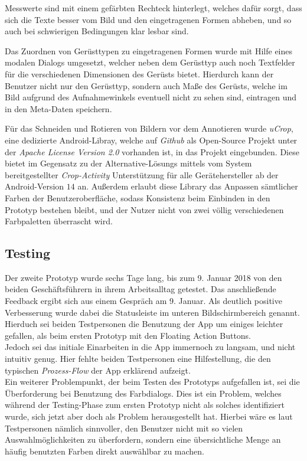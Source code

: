 Messwerte sind mit einem gefärbten Rechteck hinterlegt, welches dafür sorgt, dass sich die Texte besser vom Bild und den eingetragenen Formen abheben, und so auch bei schwierigen Bedingungen klar lesbar sind. 

Das Zuordnen von Gerüsttypen zu eingetragenen Formen wurde mit Hilfe eines modalen Dialogs umgesetzt, welcher neben dem Gerüsttyp auch noch Textfelder für die verschiedenen Dimensionen des Gerüsts bietet.
Hierdurch kann der Benutzer nicht nur den Gerüsttyp, sondern auch Maße des Gerüsts, welche im Bild aufgrund des Aufnahmewinkels eventuell nicht zu sehen sind, eintragen und in den Meta-Daten speichern.

Für das Schneiden und Rotieren von Bildern vor dem Annotieren wurde \emph{uCrop}, eine dedizierte Android-Libray, welche auf \emph{Github} als Open-Source Projekt unter der \emph{Apache License Version 2.0} vorhanden ist, in das Projekt eingebunden.  
Diese bietet im Gegensatz zu der Alternative-Lösungs mittels vom System bereitgestellter \emph{Crop-Activity} Unterstützung für alle Gerätehersteller ab der Android-Version $14$ an.
Außerdem erlaubt diese Library das Anpassen sämtlicher Farben der Benutzeroberfläche, sodass Konsistenz beim Einbinden in den Prototyp bestehen bleibt, und der Nutzer nicht von zwei völlig verschiedenen Farbpaletten überrascht wird. 

\subsection{Testing}
Der zweite Prototyp wurde sechs Tage lang, bis zum 9. Januar 2018 von den beiden Geschäftsführern in ihrem Arbeitsalltag getestet.
Das anschließende Feedback ergibt sich aus einem Gespräch am 9. Januar.
Als deutlich positive Verbesserung wurde dabei die Statusleiste im unteren Bildschirmbereich genannt.
Hierduch sei beiden Testpersonen die Benutzung der App um einiges leichter gefallen, als beim ersten Prototyp mit den Floating Action Buttons. \\

Jedoch sei das initiale Einarbeiten in die App immernoch zu langsam, und nicht intuitiv genug.
Hier fehlte beiden Testpersonen eine Hilfestellung, die den typischen \emph{Prozess-Flow} der App erklärend aufzeigt. \\

Ein weiterer Problempunkt, der beim Testen des Prototyps aufgefallen ist, sei die Überforderung bei Benutzung des Farbdialogs.
Dies ist ein Problem, welches während der Testing-Phase zum ersten Prototyp nicht als solches identifiziert wurde, sich jetzt aber doch als Problem herausgestellt hat.
Hierbei wäre es laut Testpersonen nämlich sinnvoller, den Benutzer nicht mit so vielen Auswahlmöglichkeiten zu überfordern, sondern eine übersichtliche Menge an häufig benutzten Farben direkt auswählbar zu machen. \\

